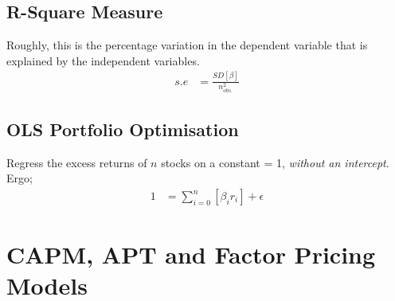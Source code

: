 \documentclass[a4paper]{article}
\begin{document}
\subsection{R-Square Measure}
Roughly, this is the percentage variation in the dependent variable that is
explained by the independent variables.
\begin{align*}
s.e &= \frac{SD[\beta]}{n_{obs.}^2}
\end{align*}

\subsection{OLS Portfolio Optimisation}
Regress the excess returns of $n$ stocks on a constant = 1, \emph{without an
intercept}. Ergo;
\begin{align*}
1 &= \sum_{i = 0}^n [\beta_i r_i] + \epsilon
\end{align*}




\section{CAPM, APT and Factor Pricing Models}
\end{document}
